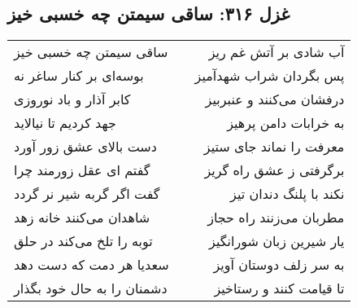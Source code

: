 \begin{center}
\section*{غزل ۳۱۶: ساقی سیمتن چه خسبی خیز}
\label{sec:316}
\begin{longtable}{l p{0.5cm} r}
ساقی سیمتن چه خسبی خیز
&&
آب شادی بر آتش غم ریز
\\
بوسه‌ای بر کنار ساغر نه
&&
پس بگردان شراب شهدآمیز
\\
کابر آذار و باد نوروزی
&&
درفشان می‌کنند و عنبربیز
\\
جهد کردیم تا نیالاید
&&
به خرابات دامن پرهیز
\\
دست بالای عشق زور آورد
&&
معرفت را نماند جای ستیز
\\
گفتم ای عقل زورمند چرا
&&
برگرفتی ز عشق راه گریز
\\
گفت اگر گربه شیر نر گردد
&&
نکند با پلنگ دندان تیز
\\
شاهدان می‌کنند خانه زهد
&&
مطربان می‌زنند راه حجاز
\\
توبه را تلخ می‌کند در حلق
&&
یار شیرین زبان شورانگیز
\\
سعدیا هر دمت که دست دهد
&&
به سر زلف دوستان آویز
\\
دشمنان را به حال خود بگذار
&&
تا قیامت کنند و رستاخیز
\\
\end{longtable}
\end{center}

